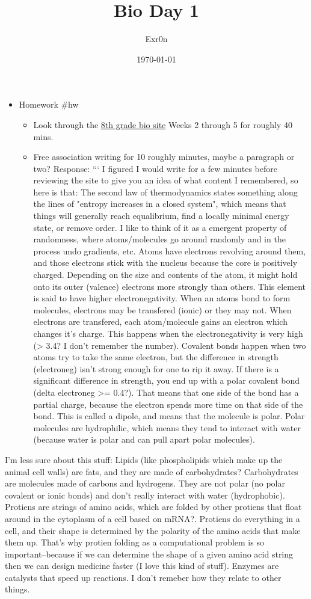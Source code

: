 \documentclass[letterpaper]{article}
\author{Exr0n}
\date{\today}
\title{Bio Day 1}
\renewcommand{\tableofcontents}{}
\begin{document}
\tableofcontents

\begin{itemize}
\item Homework \#hw

\begin{itemize}
\item Look through the
\href{https://nuevaschool.instructure.com/courses/3017/assignments/50846}{8th
grade bio site} Weeks 2 through 5 for roughly 40 mins.
\item Free association writing for 10 roughly minutes, maybe a paragraph
or two? Response: ``` I figured I would write for a few minutes
before reviewing the site to give you an idea of what content I
remembered, so here is that: The second law of thermodynamics states
something along the lines of "entropy increases in a closed system",
which means that things will generally reach equalibrium, find a
locally minimal energy state, or remove order. I like to think of it
as a emergent property of randomness, where atoms/molecules go
around randomly and in the process undo gradients, etc. Atoms have
electrons revolving around them, and those electrons stick with the
nucleus because the core is positively charged. Depending on the
size and contents of the atom, it might hold onto its outer
(valence) electrons more strongly than others. This element is said
to have higher electronegativity. When an atoms bond to form
molecules, electrons may be transfered (ionic) or they may not. When
electrons are transfered, each atom/molecule gains an electron which
changes it's charge. This happens when the electronegativity is very
high (> 3.4? I don't remember the number). Covalent bonds happen
when two atoms try to take the same electron, but the difference in
strength (electroneg) isn't strong enough for one to rip it away. If
there is a significant difference in strength, you end up with a
polar covalent bond (delta electroneg >= 0.4?). That means that one
side of the bond has a partial charge, because the electron spends
more time on that side of the bond. This is called a dipole, and
means that the molecule is polar. Polar molecules are hydrophilic,
which means they tend to interact with water (because water is polar
and can pull apart polar molecules).
\end{itemize}
\end{itemize}

I'm less sure about this stuff: Lipids (like phospholipids which make up
the animal cell walls) are fats, and they are made of carbohydrates?
Carbohydrates are molecules made of carbons and hydrogens. They are not
polar (no polar covalent or ionic bonds) and don't really interact with
water (hydrophobic). Protiens are strings of amino acids, which are
folded by other protiens that float around in the cytoplasm of a cell
based on mRNA?. Protiens do everything in a cell, and their shape is
determined by the polarity of the amino acids that make them up. That's
why protien folding as a computational problem is so important--because
if we can determine the shape of a given amino acid string then we can
design medicine faster (I love this kind of stuff). Enzymes are
catalysts that speed up reactions. I don't remeber how they relate to
other things.
\end{document}
